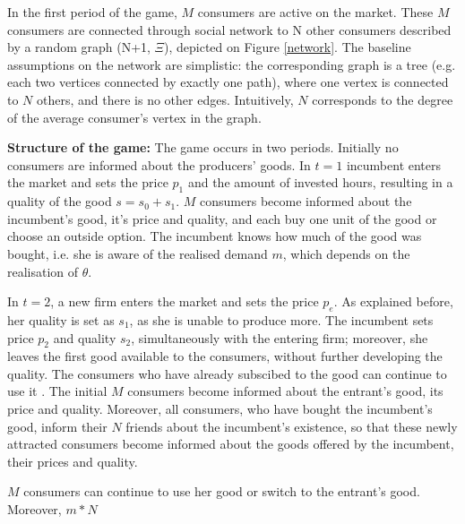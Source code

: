 \documentclass{article}
\numberwithin{figure}{section}
\numberwithin{table}{section}
\theoremstyle{indented}
\numberwithin{equation}{section} %
\begin{document}

In the first period of the game, $M$ consumers are active on the market. These $M$ consumers are connected through social network to N other consumers described by a random graph (N+1, $\Xi$), depicted on Figure \ref{network}. The baseline assumptions on the network are simplistic: the corresponding graph is a tree (e.g. each two vertices connected by exactly one path), where one vertex is connected to $N$ others, and there is no other edges. Intuitively, $N$ corresponds to the degree of the average consumer's vertex in the graph. 

\textbf{Structure of the game:}
The game occurs in two periods. Initially no consumers are informed about the producers' goods. In \textbf{$t=1$} incumbent enters the market and sets the price $p_1$ and the amount of invested hours, resulting in a quality of the good $s = s_0+s_1$. $M$ consumers become informed about the incumbent's good, it's price and quality, and each buy one unit of the good or choose an outside option. The incumbent knows how much of the good was bought, i.e. she is aware of the realised demand $m$, which depends on the realisation of $\theta$. 

In \textbf{$t=2$}, a new firm enters the market and sets the price $p_e$. As explained before, her quality is set as $s_1$, as she is unable to produce more. The incumbent sets price $p_2$ and quality $s_2$, simultaneously with the entering firm; moreover, she leaves the first good available to the consumers, without further developing the quality. The consumers who have already subscibed to the good can continue to use it . The initial $M$ consumers become informed about the entrant's good, its price and quality. Moreover, all consumers, who have bought the incumbent's good, inform their $N$ friends about the incumbent's existence, so that these newly attracted consumers become informed about the goods offered by the incumbent, their prices and quality.

$M$ consumers can continue to use her good or switch to the entrant's good. Moreover, $m*N$ 
\end{document}
